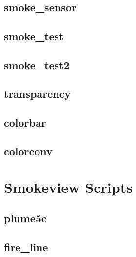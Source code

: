 \documentclass[11pt,twoside]{book}
\newcommand{\fdsinput}[1]{
{
\scriptsize

}
}
\begin{document}
\section{smoke\_sensor}
\label{FDSsmokesensor}
\fdsinput{smoke_sensor.fds}

\section{smoke\_test}
\label{FDSsmoketest}
\fdsinput{smoke_test.fds}

\section{smoke\_test2}
\label{FDSsmoketest2}
\fdsinput{smoke_test2.fds}


\section{transparency}
\label{FDStransparency}
\fdsinput{transparency.fds}

\section{colorbar}
\label{FDScolorbar}
\fdsinput{colorbar.fds}

\section{colorconv}
\label{FDScolorconv}
\fdsinput{colorconv.fds}

\chapter{Smokeview Scripts}
\label{smvscripts}
\section{plume5c}
\label{SSFplume5c}
\fdsinput{plume5c.ssf}

\section{fire\_line}
\label{SSFfireline}
\fdsinput{fire_line.ssf}
\end{document}
